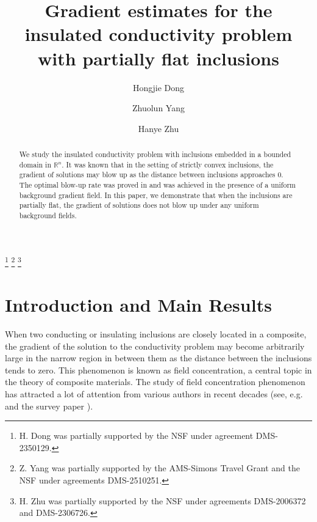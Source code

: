 \documentclass[reqno, 10pt]{amsart}
\theoremstyle{plain}
\theoremstyle{definition}
\theoremstyle{remark}
\numberwithin{equation}{section}
\newcommand{\bR}{\mathbb{R}}
\begin{document}
\title[Insulated conductivity problem with partially flat inclusions]{Gradient estimates for the insulated conductivity problem with partially flat inclusions}

\author[H. Dong]{Hongjie Dong}

\author[Z. Yang]{Zhuolun Yang}

\author[H. Zhu]{Hanye Zhu}

\address[H. Dong]{Division of Applied Mathematics, Brown University, 182 George Street, Providence, RI 02912, USA}


\address[Z. Yang]{Division of Applied Mathematics, Brown University, 182 George Street, Providence, RI 02912, USA; Department of Mathematics, The Ohio State University, 231 West 18th Avenue, Columbus, OH 43210, USA }


\address[H. Zhu]{Department of Mathematics, Duke University, 120 Science Drive, Durham, NC 27708, USA}

\thanks{H. Dong was partially supported by the NSF under agreement DMS-2350129.}
\thanks{Z. Yang was partially supported by the AMS-Simons Travel Grant and the NSF under agreements DMS-2510251.}
\thanks{H. Zhu was partially supported by the NSF under agreements DMS-2006372 and DMS-2306726.}



\begin{abstract}
We study the insulated conductivity problem with inclusions embedded in a bounded domain in $\bR^n$. It was known that in the setting of strictly convex inclusions, the gradient of solutions may blow up as the distance between inclusions approaches 0. The optimal blow-up rate was proved in \cites{DLY} and was achieved in the presence of a uniform background gradient field. In this paper, we demonstrate that when the inclusions are partially flat, the gradient of solutions does not blow up under any uniform background fields.
\end{abstract}

\maketitle
\section{Introduction and Main Results}
When two conducting or insulating inclusions are closely located in a composite, the gradient of the solution to the conductivity problem may become arbitrarily large in the narrow region in between them as the distance between the inclusions tends to zero. This phenomenon is known as field concentration, a central topic in the theory of composite materials. The study of field concentration phenomenon has attracted a lot of attention from various authors in recent decades (see, e.g. \cites{ACKLY,BASL,BLY2,BV,DLY,DYZ24,fukushima2024finiteness,li2024optimalgradientestimatesinsulated,LN,We,Y1} and the survey paper \cite{Kang}).
\end{document}
